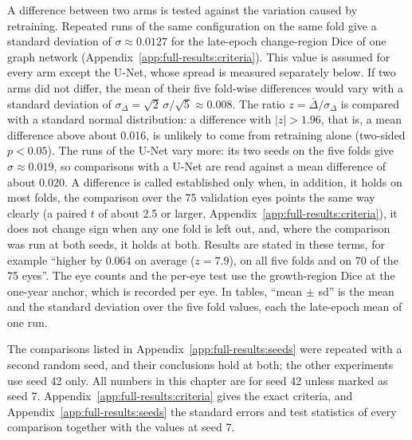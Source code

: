 A difference between two arms is tested against the variation caused by
retraining. Repeated runs of the same configuration on the same fold give a
standard deviation of $\sigma \approx 0.0127$ for the late-epoch
change-region Dice of one graph network
(Appendix~\ref{app:full-results:criteria}). This value is assumed for every
arm except the U-Net, whose spread is measured separately below. If two arms did not differ, the
mean of their five fold-wise differences would vary with a standard
deviation of $\sigma_\Delta = \sqrt{2}\,\sigma / \sqrt{5} \approx 0.008$.
The ratio $z = \bar{\Delta} / \sigma_\Delta$ is compared with a standard
normal distribution: a difference with $|z| > 1.96$, that is, a mean
difference above about 0.016, is unlikely to come from retraining alone
(two-sided $p < 0.05$). The runs of the U-Net vary more: its two seeds on
the five folds give $\sigma \approx 0.019$, so comparisons with a U-Net are
read against a mean difference of about 0.020. A difference is called
established only when, in addition, it holds on most folds, the
comparison over the 75 validation eyes points the same way clearly (a
paired $t$ of about 2.5 or larger,
Appendix~\ref{app:full-results:criteria}), it does not change sign when any
one fold is left out, and, where the comparison was run at both seeds, it
holds at both. Results are stated in these terms,
for example ``higher by 0.064 on average ($z = 7.9$), on all five folds and
on 70 of the 75 eyes''. The eye counts and the per-eye test use the
growth-region Dice at the one-year anchor, which is recorded per eye. In tables, ``mean $\pm$ sd'' is the mean and the
standard deviation over the five fold values, each the late-epoch mean of
one run.

The comparisons listed in Appendix~\ref{app:full-results:seeds} were
repeated with a second random seed, and their conclusions hold at both;
the other experiments use seed 42 only. All numbers in this chapter are for
seed 42 unless marked as seed 7. Appendix~\ref{app:full-results:criteria}
gives the exact criteria, and Appendix~\ref{app:full-results:seeds} the
standard errors and test statistics of every comparison together with the
values at seed 7.


